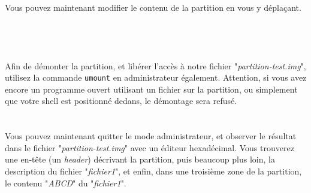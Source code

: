 \\

Vous pouvez maintenant modifier le contenu de la partition en vous y déplaçant.\\

\\
\\
\\
\\

Afin de démonter la partition, et libérer l'accès à notre fichier "\textit{partition-test.img}", utilisez la commande \texttt{umount} en administrateur également.
Attention, si vous avez encore un programme ouvert utilisant un fichier sur la partition, ou simplement que votre shell est positionné dedans, le démontage sera refusé.\\

\\
\\

Vous pouvez maintenant quitter le mode administrateur, et observer le résultat dans le fichier "\textit{partition-test.img}" avec un éditeur hexadécimal.
Vous trouverez une en-tête (un \textit{header}) décrivant la partition, puis beaucoup plus loin, la description du fichier "\textit{fichier1}", et enfin, dans une troisième zone de la partition, le contenu "\textit{ABCD}" du "\textit{fichier1}".



\setlength{\parindent}{\defaultparindent}	

